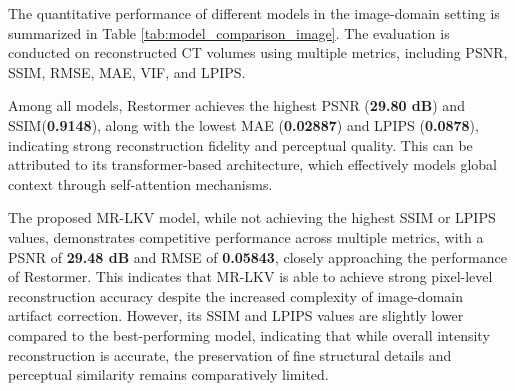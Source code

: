 The quantitative performance of different models in the image-domain setting is summarized in Table \ref{tab:model_comparison_image}. The evaluation is conducted on reconstructed CT volumes using multiple metrics, including PSNR, SSIM, RMSE, MAE, VIF, and LPIPS.
\begin{table}[H]
\centering
\caption{Quantitative comparison of reconstruction quality across different models in the image-domain}
\label{tab:model_comparison_image}
\renewcommand{\arraystretch}{1.2}

\end{table}
Among all models, Restormer achieves the highest PSNR (\textbf{29.80 dB}) and SSIM(\textbf{0.9148}), along with the lowest MAE (\textbf{0.02887}) and LPIPS (\textbf{0.0878}), indicating strong reconstruction fidelity and perceptual quality. This can be attributed to its transformer-based architecture, which effectively models global context through self-attention mechanisms.

The proposed MR-LKV model, while not achieving the highest SSIM or LPIPS values, demonstrates competitive performance across multiple metrics, with a PSNR of \textbf{29.48 dB} and RMSE of \textbf{0.05843}, closely approaching the performance of Restormer. This indicates that MR-LKV is able to achieve strong pixel-level reconstruction accuracy despite the increased complexity of image-domain artifact correction. However, its SSIM and LPIPS values are slightly lower compared to the best-performing model, indicating that while overall intensity reconstruction is accurate, the preservation of fine structural details and perceptual similarity remains comparatively limited.


